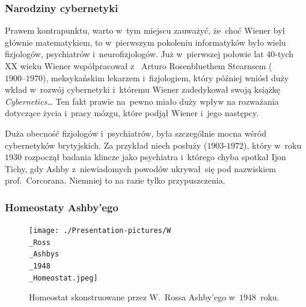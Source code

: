 \documentclass[10pt,t]{beamer}
\begin{document}
\begin{frame}
  \frametitle{Narodziny cybernetyki}


  Prawem kontrapunktu, warto w~tym miejscu zauważyć, że~choć Wiener był
  głównie matematykiem, to w~pierwszym pokoleniu informatyków było wielu
  fizjologów, psychiatrów i~neurofizjologów. Już w~pierwszej połowie lat
  $40$-tych XX wieku Wiener współpracował
  z~
  {Arturo Rosenbluethem Stearnsem} ($1900\text{--}1970$), meksykańskim
  lekarzem i~fizjologiem, który później wniósł duży wkład w~rozwój
  cybernetyki i~któremu Wiener zadedykował swoją książkę
  \textit{Cybernetics\ldots} Ten fakt prawie na~pewno miało duży wpływ na
  rozważania dotyczące życia i~pracy mózgu, które podjął Wiener i~jego
  następcy.

  Duża obecność fizjologów i~psychiatrów, była szczególnie mocna wśród
  cybernetyków brytyjskich. Za przykład niech posłuży
   ($1903\text{-}1972$), który w~roku $1930$ rozpoczął badania
  klincze jako psychiatra i~którego chyba spotkał Ijon Tichy, gdy Ashby
  z~niewiadomych powodów ukrywał~się pod nazwiskiem
  prof.~Corcorana. Niemniej to na razie tylko przypuszczenia.

\end{frame}





\begin{frame}
  \frametitle{Homeostaty Ashby’ego}


  \begin{figure}

    \centering


    \texttt{[image: ./Presentation-pictures/W\\\_Ross\\\_Ashbys\\\_1948\\\_Homeostat.jpeg]}


    \caption{
      {Homeostat} skonstruowane przez W.~Rossa Ashby’ego w~$1948$~roku.}


    \label{fig:Homeostat-01}

  \end{figure}

\end{frame}
\end{document}
